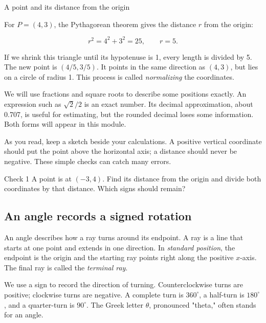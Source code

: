 \begin{moneexample}{A point and its distance from the origin}


For \(P=(4,3)\), the Pythagorean theorem gives the distance \(r\) from the origin:


\[r^2=4^2+3^2=25,\qquad r=5.\]

If we shrink this triangle until its hypotenuse is 1, every length is divided by 5. The new point is \((4/5,3/5)\). It points in the same direction as \((4,3)\), but lies on a circle of radius 1. This process is called \emph{normalizing} the coordinates.


\end{moneexample}


We will use fractions and square roots to describe some positions exactly. An expression such as \(\sqrt2/2\) is an exact number. Its decimal approximation, about 0.707, is useful for estimating, but the rounded decimal loses some information. Both forms will appear in this module.



As you read, keep a sketch beside your calculations. A positive vertical coordinate should put the point above the horizontal axis; a distance should never be negative. These simple checks can catch many errors.


\begin{monecheck}{Check 1}
A point is at \((-3,4)\). Find its distance from the origin and divide both coordinates by that distance. Which signs should remain?
\end{monecheck}

\subsection{An angle records a signed rotation}

An angle describes how a ray turns around its endpoint. A ray is a line that starts at one point and extends in one direction. In \emph{standard position}, the endpoint is the origin and the starting ray points right along the positive \(x\)-axis. The final ray is called the \emph{terminal ray}.



We use a sign to record the direction of turning. Counterclockwise turns are positive; clockwise turns are negative. A complete turn is \(360^\circ\), a half-turn is \(180^\circ\), and a quarter-turn is \(90^\circ\). The Greek letter \(\theta\), pronounced "theta," often stands for an angle.




